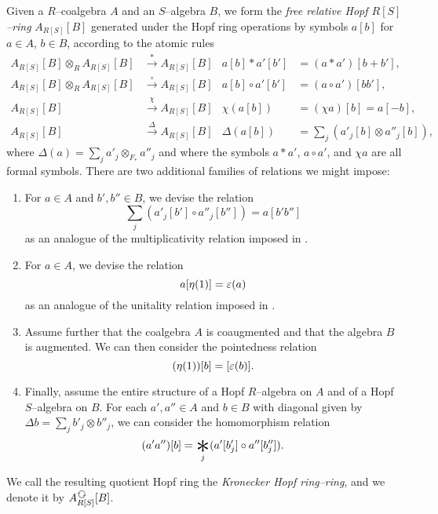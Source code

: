 \begin{definition}\label{DefnAlgebraicModelOfCoopns}
Given a \(R\)--coalgebra \(A\) and an \(S\)--algebra \(B\), we form the \textit{free relative Hopf \(R[S]\)--ring} \(A_{R[S]}[B]\) generated under the Hopf ring operations by symbols \(a[b]\) for \(a \in A\), \(b \in B\), according to the atomic rules
\begin{align*}
A_{R[S]}[B] \otimes_R A_{R[S]}[B] & \xrightarrow{\ast} A_{R[S]}[B] &
a[b] \ast a'[b'] & = (a \ast a') [b + b'], \\
A_{R[S]}[B] \otimes_R A_{R[S]}[B] & \xrightarrow{\circ} A_{R[S]}[B] &
a[b] \circ a'[b'] & = (a \circ a') [b b'], \\
A_{R[S]}[B] & \xrightarrow{\chi} A_{R[S]}[B] &
\chi(a[b]) & = (\chi a)[b] = a[-b], \\
A_{R[S]}[B] & \xrightarrow{\Delta} A_{R[S]}[B] &
\Delta(a[b]) & = \sum_j (a'_j[b] \otimes a''_j[b]),
\end{align*}
where \(\Delta(a) = \sum_j a'_j \otimes_{F_*} a''_j\) and where the symbols \(a \ast a'\), \(a \circ a'\), and \(\chi a\) are all formal symbols.  There are two additional families of relations we might impose:
\begin{enumerate}
    \item For \(a \in A\) and \(b', b'' \in B\), we devise the relation \[\sum_j (a'_j[b'] \circ a''_j[b'']) = a[b'b'']\] as an analogue of the multiplicativity relation imposed in .
    \item For \(a \in A\), we devise the relation \[a[\eta(1)] = \varepsilon(a)\] as an analogue of the unitality relation imposed in .
    \item Assume further that the coalgebra \(A\) is coaugmented and that the algebra \(B\) is augmented.  We can then consider the pointedness relation \[(\eta(1))[b] = [\varepsilon(b)].\]
    \item Finally, assume the entire structure of a Hopf \(R\)--algebra on \(A\) and of a Hopf \(S\)--algebra on \(B\).  For each \(a', a'' \in A\) and \(b \in B\) with diagonal given by \(\Delta b = \sum_j b'_j \otimes b''_j\), we can consider the homomorphism relation \[(a'a'')[b] = \bigast_j (a'[b'_j] \circ a''[b''_j]).\]
\end{enumerate}
We call the resulting quotient Hopf ring the \textit{Kronecker Hopf ring--ring}, and we denote it by \(A_{R[S]}^{\circulatearrows}[B]\).
\end{definition}

